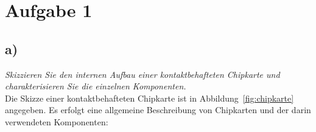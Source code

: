 \chapter{Aufgabe 1}

\section{a)}

\textit{Skizzieren Sie den internen Aufbau einer kontaktbehafteten Chipkarte und charakterisieren Sie die einzelnen Komponenten.}\\

\noindent
Die Skizze einer kontaktbehafteten Chipkarte ist in Abbildung~\ref{fig:chipkarte} angegeben.
Es erfolgt eine allgemeine Beschreibung von Chipkarten und der darin verwendeten Komponenten:

